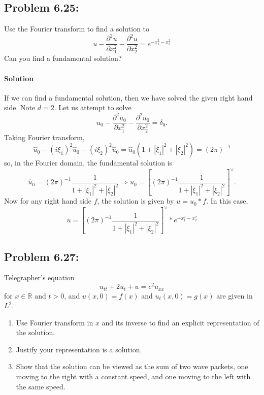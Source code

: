 \documentclass[letterpaper,twoside,11pt]{article}
\theoremstyle{mystyle}
\newcommand{\R}{{\mathbb R}}
\begin{document}
\subsection*{Problem 6.25:} 
Use the Fourier transform to find a solution to 
\[u - \frac{\partial^2 u }{\partial x_1^2 } - \frac{\partial^2 u }{\partial x_2^2 } = e^{-x_1^2 - x_2^2 } \] 
Can you find a fundamental solution? 

\paragraph*{Solution} If we can find a fundamental solution, then we have solved the given right hand side. Note $d=2$. Let us attempt to solve 
\[u_0 - \frac{{{\partial ^2}u_0}}{{\partial x_1^2}} - \frac{{{\partial ^2}u_0}}{{\partial x_2^2}} = {\delta _0}.\] 
Taking Fourier transform, 
\[\hat u_0 - {\left( {i{\xi _1}} \right)^2}\hat u_0 - {\left( {i{\xi _2}} \right)^2}\hat u_0 = \hat u_0\left( {1 + {{\left| {{\xi _1}} \right|}^2} + {{\left| {{\xi _2}} \right|}^2}} \right) = {\left( {2\pi } \right)^{ - 1}}\]
so, in the Fourier domain, the fundamental solution is 
\[\hat u_0 = {\left( {2\pi } \right)^{ - 1}}\frac{1}{{1 + {{\left| {{\xi _1}} \right|}^2} + {{\left| {{\xi _2}} \right|}^2}}} \Rightarrow {{ u}_0} = {\left[ {{{\left( {2\pi } \right)}^{ - 1}}\frac{1}{{1 + {{\left| {{\xi _1}} \right|}^2} + {{\left| {{\xi _2}} \right|}^2}}}} \right]^ \vee }.\]
Now for any right hand side $f$, the solution is given by $u = u_0 \ast f$. In this case, 
\[u = {\left[ {{{\left( {2\pi } \right)}^{ - 1}}\frac{1}{{1 + {{\left| {{\xi _1}} \right|}^2} + {{\left| {{\xi _2}} \right|}^2}}}} \right]^ \vee } * {e^{ - x_1^2 - x_2^2}}\]








\subsection*{Problem 6.27:}
Telegrapher's equation 
\[u_{tt} + 2u_t + u = c^2 u_{xx} \]
for $x \in \R$ and $t>0$, and $u(x, 0) = f(x)$ and $u_t(x, 0) = g(x)$ are given in $L^2$. 
\begin{enumerate}
  \item Use Fourier transform in $x$ and its inverse to find an explicit representation of the solution. 
  \item Justify your representation is a solution. 
  \item Show that the solution can be viewed as the sum of two wave packets, one moving to the right with a constant speed, and one moving to the left with the same speed. 
\end{enumerate}
\end{document}
